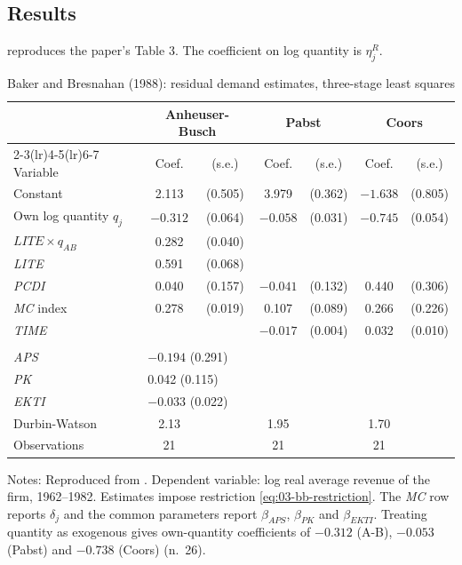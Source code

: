 \subsection{Results}\label{sec:03-bb-results}

 reproduces the paper's Table 3. The coefficient on log quantity is $\eta^R_j$.

\begin{table}[htbp]
\centering
\caption{Baker and Bresnahan (1988): residual demand estimates, three-stage least squares}
\label{tab:03-baker-bresnahan}
\begin{tabular}{lcccccc}
\toprule
 & \multicolumn{2}{c}{Anheuser-Busch} & \multicolumn{2}{c}{Pabst} & \multicolumn{2}{c}{Coors} \\
\cmidrule(lr){2-3}\cmidrule(lr){4-5}\cmidrule(lr){6-7}
Variable & Coef. & (s.e.) & Coef. & (s.e.) & Coef. & (s.e.) \\
\midrule
Constant & 2.113 & (0.505) & 3.979 & (0.362) & $-1.638$ & (0.805) \\
Own log quantity $q_j$ & $-0.312$ & (0.064) & $-0.058$ & (0.031) & $-0.745$ & (0.054) \\
$\mathit{LITE} \times q_{AB}$ & 0.282 & (0.040) & & & & \\
\textit{LITE} & 0.591 & (0.068) & & & & \\
\textit{PCDI} & 0.040 & (0.157) & $-0.041$ & (0.132) & 0.440 & (0.306) \\
\textit{MC} index & 0.278 & (0.019) & 0.107 & (0.089) & 0.266 & (0.226) \\
\textit{TIME} & & & $-0.017$ & (0.004) & 0.032 & (0.010) \\
\addlinespace
\multicolumn{7}{l}{\textit{Common parameters of the MC index}} \\
\textit{APS} & \multicolumn{6}{l}{$-0.194$ (0.291)} \\
\textit{PK} & \multicolumn{6}{l}{0.042 (0.115)} \\
\textit{EKTI} & \multicolumn{6}{l}{$-0.033$ (0.022)} \\
\addlinespace
Durbin-Watson & 2.13 & & 1.95 & & 1.70 & \\
Observations & 21 & & 21 & & 21 & \\
\bottomrule
\end{tabular}

\smallskip
\begin{minipage}{0.95\textwidth}
\footnotesize Notes: Reproduced from \citet[Table 3]{BakerBresnahan1988}. Dependent variable: log real
average revenue of the firm, 1962--1982. Estimates impose restriction \eqref{eq:03-bb-restriction}. The
\textit{MC} row reports $\delta_j$ and the common parameters report $\beta_{APS}$, $\beta_{PK}$ and
$\beta_{EKTI}$. Treating quantity as exogenous gives own-quantity coefficients of $-0.312$ (A-B),
$-0.053$ (Pabst) and $-0.738$ (Coors) (n.~26).
\end{minipage}
\end{table}

